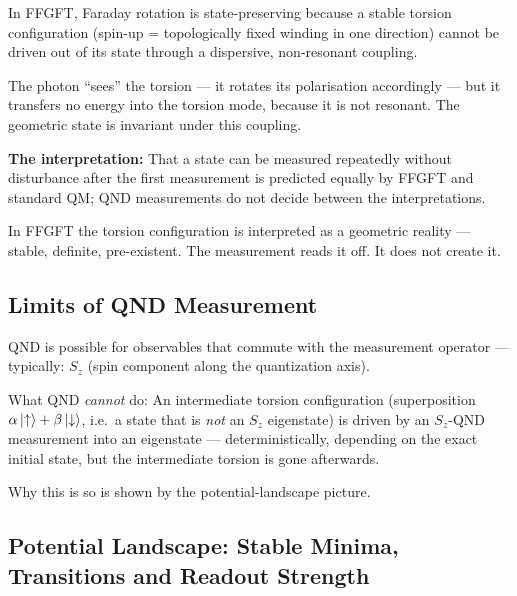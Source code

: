 \begin{foundation}
In FFGFT, Faraday rotation is state-preserving
because a stable torsion configuration
(spin-up = topologically fixed winding in one direction)
cannot be driven out of its state through a dispersive,
non-resonant coupling.

The photon ``sees'' the torsion --- it rotates its
polarisation accordingly --- but it transfers no
energy into the torsion mode, because it is not resonant.
The geometric state is invariant under this coupling.

\textbf{The interpretation:}
That a state can be measured repeatedly without disturbance
after the first measurement is predicted equally by FFGFT and
standard QM; QND measurements do not decide between
the interpretations.

In FFGFT the torsion configuration is interpreted as a
geometric reality --- stable, definite, pre-existent.
The measurement reads it off. It does not create it.
\end{foundation}

\subsection{Limits of QND Measurement}

QND is possible for observables that commute with the
measurement operator --- typically: $S_z$ (spin component
along the quantization axis).

What QND \emph{cannot} do:
An intermediate torsion configuration
(superposition $\alpha\left|\uparrow\right\rangle + \beta\left|\downarrow\right\rangle$,
i.e.~a state that is \emph{not} an $S_z$ eigenstate)
is driven by an $S_z$-QND measurement into an eigenstate
--- deterministically, depending on the exact
initial state, but the intermediate torsion is gone afterwards.

Why this is so is shown by the potential-landscape picture.

\subsection{Potential Landscape: Stable Minima, Transitions and Readout Strength}

